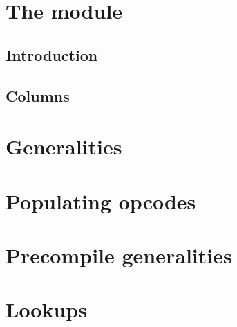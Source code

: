 
\section{The \oobMod{} module}
\subsection{Introduction}               \label{oob: intro}                    
\subsection{Columns}                    \label{oob: columns}                  
\section{Generalities}                  \label{oob: generalities}             
\section{Populating opcodes}            \label{oob: populating: opcodes}      
\section{Precompile generalities}       \label{oob: populating: precompiles}  
\section{Lookups}                       \label{oob: lookups}                  
